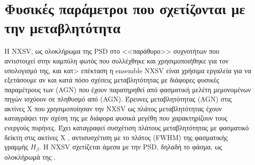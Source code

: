 

\section{Φυσικές παράμετροι που σχετίζονται με την μεταβλητότητα}

Η \textlatin{NXSV}, ως ολοκλήρωμα της \textlatin{PSD} στο <<παράθυρο>> συχνοτήτων που αντιστοιχεί στην καμπύλη φωτός που συλλέχθηκε και χρησιμοποιήθηκε για τον υπολογισμό της, και κατ> επέκταση η  \textlatin{ensemble NXSV} είναι χρήσιμα εργαλεία για να εξετάσουμε αν και κατά πόσο σχέσεις μεταβλητότητας με διάφορες φυσικές παραμέτρους των \textlatin{(AGN)} που έχουν παρατηρηθεί από φασματική μελέτη μεμονομένων πηγών ισχύουν σε πληθυσμό από \textlatin{(AGN)}\cite{2012A&A...542A..83P}.
Έρευνες μεταβλητότητας \textlatin{(AGN)} στις ακτίνες Χ που χρησιμοποίησαν την \textlatin{NXSV} ως πλάτος μεταβλητότητας έχουν καταγράψει την σχέση της με διάφορα φυσικά μεγέθη που χαρακτηρίζουν τους ενεργούς πυρήνες. 
Έχει καταγραφεί συσχέτιση πλάτους μεταβλητότητας με φασματικό δείκτη στις ακτίνες Χ \cite{1999ApJ...524..667T}, αντισυσχέτιση με το πλάτος \textlatin{(FWHM)} της φασματικής γραμμής $H_\beta$\cite{1999ApJ...524..667T}. Η \textlatin{NXSV} σχετίζεται άμεσα με την \textlatin{PSD}, δηλαδή το φάσμα, ως ολοκλήρωμά της \cite{2012A&A...544A..80G}.

